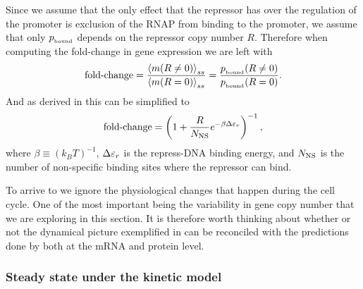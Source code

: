 Since we assume that the only effect that the repressor has over the regulation
of the promoter is exclusion of the RNAP from binding to the promoter, we assume
that only $p_{_\text{bound}}$ depends on the repressor copy number $R$. Therefore when
computing the fold-change in gene expression we  are left with
\begin{equation}
  \text{fold-change} = {\left\langle m (R \neq 0) \right\rangle_{ss} \over \left\langle m (R = 0) \right\rangle_{ss}}
              = {p_{_\text{bound}} (R \neq 0) \over p_{_\text{bound}} (R = 0)}.
\end{equation}
And as derived in \cite{Garcia2011c} this can be simplified to
\begin{equation}
  \text{fold-change} = \left(1 + {R \over N_\text{NS}}e^{-\beta \Delta\varepsilon_r}  \right)^{-1},
  \label{seq_fold_change_thermo}
\end{equation}
where $\beta \equiv (k_BT)^{-1}$, $\Delta\varepsilon_r$ is the repress-DNA binding energy, and
$N_\text{NS}$ is the number of non-specific binding sites where the repressor can bind.

To arrive to  we ignore the physiological changes
that happen during the cell cycle. One of the most important being the
variability in gene copy number that we are exploring in this section. It is
therefore worth thinking about whether or not the dynamical picture exemplified
in  can be reconciled with the predictions done by
 both at the mRNA and protein level.

\subsubsection{Steady state under the kinetic model}

